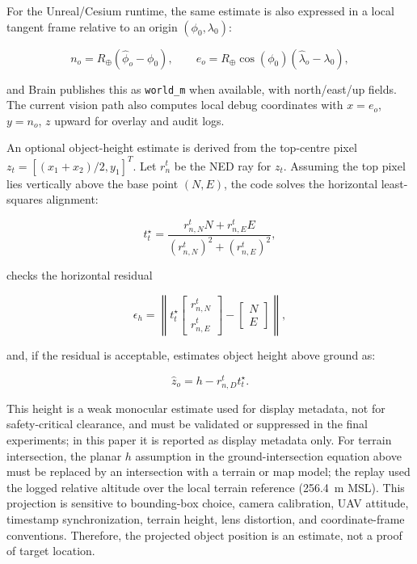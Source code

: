 \documentclass[fleqn]{VRIH2025}
\newcommand{\code}[1]{\texttt{#1}}
\begin{document}
For the Unreal/Cesium runtime, the same estimate is also expressed in a local tangent frame relative to an origin \((\phi_0,\lambda_0)\):

\begin{equation}
n_o=R_\oplus(\hat{\phi}_o-\phi_0),\qquad
e_o=R_\oplus\cos(\phi_0)(\hat{\lambda}_o-\lambda_0),
\label{eq:local-ne}
\end{equation}

and Brain publishes this as \code{world\_m} when available, with north/east/up fields. The current vision path also computes local debug coordinates with \(x=e_o\), \(y=n_o\), \(z\) upward for overlay and audit logs.

An optional object-height estimate is derived from the top-centre pixel \(z_t=[(x_1+x_2)/2,y_1]^T\). Let \(r_n^t\) be the NED ray for \(z_t\). Assuming the top pixel lies vertically above the base point \((N,E)\), the code solves the horizontal least-squares alignment:

\begin{equation}
t_t^\star =
\frac{r_{n,N}^t N+r_{n,E}^t E}{(r_{n,N}^t)^2+(r_{n,E}^t)^2},
\label{eq:height-ray-param}
\end{equation}

checks the horizontal residual

\begin{equation}
\epsilon_h =
\left\|
t_t^\star
\begin{bmatrix}
r_{n,N}^t\\
r_{n,E}^t
\end{bmatrix}
-
\begin{bmatrix}
N\\
E
\end{bmatrix}
\right\|,
\label{eq:height-residual}
\end{equation}

and, if the residual is acceptable, estimates object height above ground as:

\begin{equation}
\hat{z}_o = h-r_{n,D}^t t_t^\star.
\label{eq:height-estimate}
\end{equation}

This height is a weak monocular estimate used for display metadata, not for safety-critical clearance, and must be validated or suppressed in the final experiments; in this paper it is reported as display metadata only. For terrain intersection, the planar \(h\) assumption in the ground-intersection equation above must be replaced by an intersection with a terrain or map model; the replay used the logged relative altitude over the local terrain reference (256.4~m MSL). This projection is sensitive to bounding-box choice, camera calibration, UAV attitude, timestamp synchronization, terrain height, lens distortion, and coordinate-frame conventions. Therefore, the projected object position is an estimate, not a proof of target location.
\end{document}
